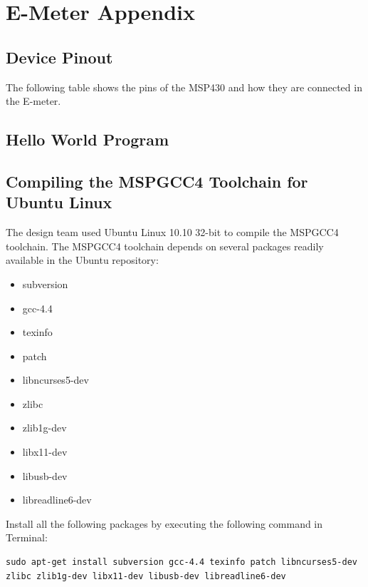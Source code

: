 \section{E-Meter Appendix}
\subsection{Device Pinout}
The following table shows the pins of the MSP430 and how they are connected in the E-meter.



\clearpage
\subsection{Hello World Program}\label{sec:hello_world}

\subsection{Compiling the MSPGCC4 Toolchain for Ubuntu Linux}\label{sec:mspgcc4_ubuntu}
The design team used Ubuntu Linux 10.10 32-bit to compile the MSPGCC4 toolchain. The MSPGCC4 toolchain depends on several packages readily available in the Ubuntu repository:
\begin{spacing}{1}
\begin{multicols}{2}
\begin{itemize}
\item subversion
\item gcc-4.4
\item texinfo
\item patch
\item libncurses5-dev
\item zlibc
\item zlib1g-dev
\item libx11-dev
\item libusb-dev
\item libreadline6-dev
\end{itemize}
\end{multicols}
\end{spacing}
Install all the following packages by executing the following command in Terminal:
\begin{lstlisting}[float, caption=Install MSPGCC4 dependencies]
sudo apt-get install subversion gcc-4.4 texinfo patch libncurses5-dev zlibc zlib1g-dev libx11-dev libusb-dev libreadline6-dev
\end{lstlisting}

